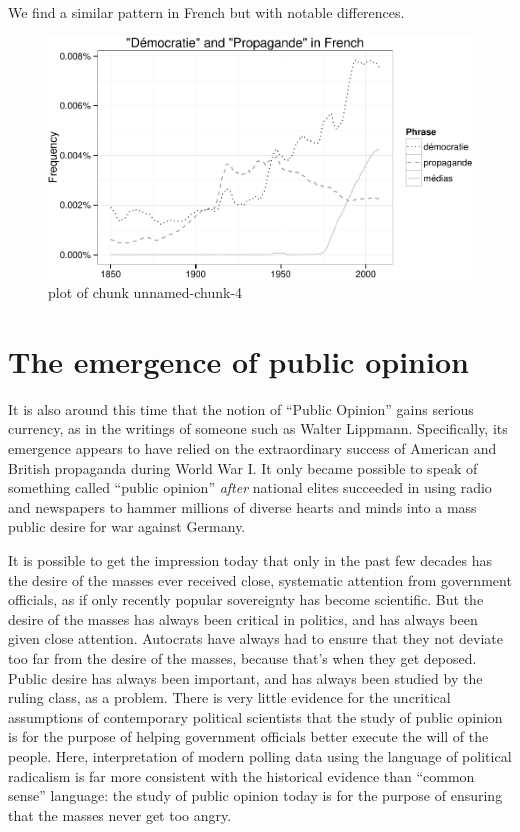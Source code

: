 \documentclass[12pt,book]{article}
\begin{document}
We find a similar pattern in French but with notable differences.

\begin{figure}[htbp]
\centering
\includegraphics{pacification_of_the_world_files/figure-latex/unnamed-chunk-4.pdf}
\caption{plot of chunk unnamed-chunk-4}
\end{figure}

\section{The emergence of public
opinion}\label{the-emergence-of-public-opinion}

It is also around this time that the notion of ``Public Opinion'' gains
serious currency, as in the writings of someone such as Walter Lippmann.
Specifically, its emergence appears to have relied on the extraordinary
success of American and British propaganda during World War I. It only
became possible to speak of something called ``public opinion''
\emph{after} national elites succeeded in using radio and newspapers to
hammer millions of diverse hearts and minds into a mass public desire
for war against Germany.

It is possible to get the impression today that only in the past few
decades has the desire of the masses ever received close, systematic
attention from government officials, as if only recently popular
sovereignty has become scientific. But the desire of the masses has
always been critical in politics, and has always been given close
attention. Autocrats have always had to ensure that they not deviate too
far from the desire of the masses, because that's when they get deposed.
Public desire has always been important, and has always been studied by
the ruling class, as a problem. There is very little evidence for the
uncritical assumptions of contemporary political scientists that the
study of public opinion is for the purpose of helping government
officials better execute the will of the people. Here, interpretation of
modern polling data using the language of political radicalism is far
more consistent with the historical evidence than ``common sense''
language: the study of public opinion today is for the purpose of
ensuring that the masses never get too angry.
\end{document}
